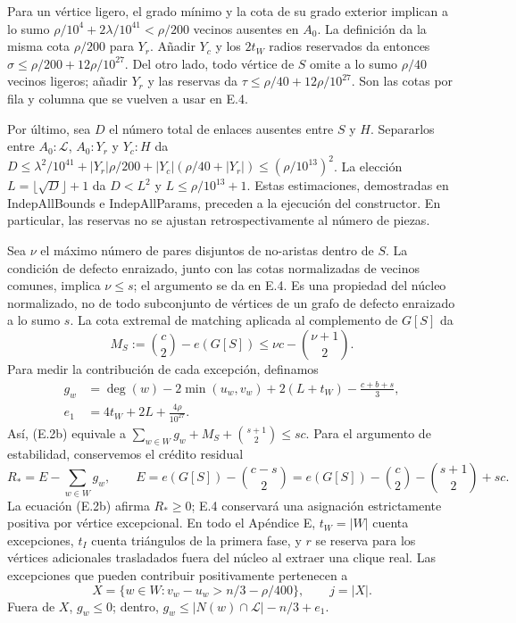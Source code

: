 \documentclass[spanish,11pt,a4paper]{article}
\begin{document}
Para un vértice ligero, el grado mínimo y la cota de su grado exterior implican a lo sumo \(\rho/10^4+2\lambda/10^{41}<\rho/200\) vecinos ausentes en \(A_0\). La definición da la misma cota \(\rho/200\) para \(Y_r\). Añadir \(Y_c\) y los \(2t_W\) radios reservados da entonces \(\sigma\le\rho/200+12\rho/10^{27}\). Del otro lado, todo vértice de \(S\) omite a lo sumo \(\rho/40\) vecinos ligeros; añadir \(Y_r\) y las reservas da \(\tau\le\rho/40+12\rho/10^{27}\). Son las cotas por fila y columna que se vuelven a usar en E.4.

Por último, sea \(D\) el número total de enlaces ausentes entre \(S\) y \(H\). Separarlos entre \(A_0\!:\!\mathcal L\), \(A_0\!:\!Y_r\) y \(Y_c\!:\!H\) da \(D\le\lambda^2/10^{41}+|Y_r|\rho/200+|Y_c|(\rho/40+|Y_r|)\le(\rho/10^{13})^2\). La elección \(L=\lfloor\sqrt D\rfloor+1\) da \(D<L^2\) y \(L\le\rho/10^{13}+1\). Estas estimaciones, demostradas en {\ttfamily\small IndepAllBoun\discretionary{\hbox{\ensuremath{\hookrightarrow}}}{}{}ds} e {\ttfamily\small IndepAllPara\discretionary{\hbox{\ensuremath{\hookrightarrow}}}{}{}ms}, preceden a la ejecución del constructor. En particular, las reservas no se ajustan retrospectivamente al número de piezas.

Sea \(\nu\) el máximo número de pares disjuntos de no-aristas dentro de \(S\). La condición de defecto enraizado, junto con las cotas normalizadas de vecinos comunes, implica \(\nu\le s\); el argumento se da en E.4. Es una propiedad del núcleo normalizado, no de todo subconjunto de vértices de un grafo de defecto enraizado a lo sumo \(s\). La cota extremal de matching aplicada al complemento de \(G[S]\) da \[
M_S:=\binom c2-e(G[S])\le \nu c-\binom{\nu+1}2.
\] Para medir la contribución de cada excepción, definamos \[
\begin{split}
g_w&=\deg(w)-2\min(u_w,v_w)+2(L+t_W)-\frac{c+b+s}{3},\\
e_1&=4t_W+2L+\frac{4\rho}{10^{27}}.
\end{split}
\] Así, (E.2b) equivale a \(\sum_{w\in W}g_w+M_S+\binom{s+1}2\le sc\). Para el argumento de estabilidad, conservemos el crédito residual \[
R_*=E-\sum_{w\in W}g_w,\qquad
E=e(G[S])-\binom{c-s}{2}
  =e(G[S])-\binom c2-\binom{s+1}2+sc.
\] La ecuación (E.2b) afirma \(R_*\ge0\); E.4 conservará una asignación estrictamente positiva por vértice excepcional. En todo el Apéndice E, \(t_W=|W|\) cuenta excepciones, \(t_I\) cuenta triángulos de la primera fase, y \(r\) se reserva para los vértices adicionales trasladados fuera del núcleo al extraer una clique real. Las excepciones que pueden contribuir positivamente pertenecen a \[
X=\{w\in W:v_w-u_w>n/3-\rho/400\},\qquad j=|X|.
\] Fuera de \(X\), \(g_w\le0\); dentro, \(g_w\le |N(w)\cap\mathcal L|-n/3+e_1\).
\end{document}

